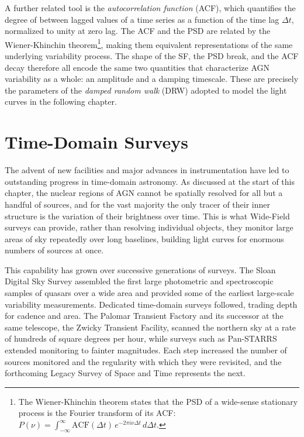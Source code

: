 A further related tool is the \textit{autocorrelation function} (ACF), which quantifies the degree of  between lagged values of a time series as a function of the time lag $\Delta t$, normalized to unity at zero lag. The ACF and the PSD are related by the Wiener-Khinchin theorem\footnote{The Wiener-Khinchin theorem states that the PSD of a wide-sense stationary process is the Fourier transform of its ACF: $P(\nu) = \int_{-\infty}^{\infty} \mathrm{ACF}(\Delta t)\, e^{-2\pi i \nu \Delta t}\, d\Delta t$.}, making them equivalent representations of the same underlying variability process. The shape of the SF, the PSD break, and the ACF decay therefore all encode the same two quantities that characterize AGN variability as a whole: an amplitude and a damping timescale. These are precisely the parameters of the \textit{damped random walk} (DRW) adopted to model the light curves in the following chapter. %


\section{Time-Domain Surveys}
\label{sec:surveys}

The advent of new facilities and major advances in instrumentation have led to outstanding progress in time-domain astronomy. As discussed at the start of this chapter, the nuclear regions of AGN cannot be spatially resolved for all but a handful of sources, and for the vast majority the only tracer of their inner structure is the variation of their brightness over time. This is what Wide-Field surveys can provide, rather than resolving individual objects, they monitor large areas of sky repeatedly over long baselines, building light curves for enormous numbers of sources at once.

This capability has grown over successive generations of surveys. The Sloan Digital Sky Survey \parencite{York2000SDSS} assembled the first large photometric and spectroscopic samples of quasars over a wide area and provided some of the earliest large-scale variability measurements. Dedicated time-domain surveys followed, trading depth for cadence and area. The Palomar Transient Factory \parencite{Law2009PTF} and its successor at the same telescope, the Zwicky Transient Facility, scanned the northern sky at a rate of hundreds of square degrees per hour, while surveys such as Pan-STARRS \parencite{Chambers2016PanStars} extended monitoring to fainter magnitudes. Each step increased the number of sources monitored and the regularity with which they were revisited, and the forthcoming Legacy Survey of Space and Time represents the next.

